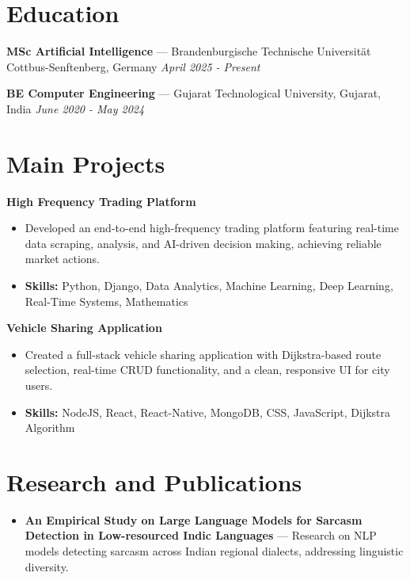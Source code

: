 \documentclass[a4paper,10pt]{article}
\begin{document}
\section*{Education}
\textbf{MSc Artificial Intelligence} — Brandenburgische Technische Universität Cottbus-Senftenberg, Germany \hfill \textit{April 2025 - Present}\par
\vspace{1.5pt}
\textbf{BE Computer Engineering} — Gujarat Technological University, Gujarat, India \hfill \textit{June 2020 - May 2024}\par

\section*{Main Projects}
\textbf{High Frequency Trading Platform}\par
\vspace{1pt}
\begin{itemize}
  \item Developed an end-to-end high-frequency trading platform featuring real-time data scraping, analysis, and AI-driven decision making, achieving reliable market actions.
  \item \textbf{Skills:} Python, Django, Data Analytics, Machine Learning, Deep Learning, Real-Time Systems, Mathematics
\end{itemize}
\vspace{3pt}
\textbf{Vehicle Sharing Application}\par
\vspace{1pt}
\begin{itemize}
  \item Created a full-stack vehicle sharing application with Dijkstra-based route selection, real-time CRUD functionality, and a clean, responsive UI for city users.
  \item \textbf{Skills:} NodeJS, React, React-Native, MongoDB, CSS, JavaScript, Dijkstra Algorithm
\end{itemize}

\section*{Research and Publications}
\begin{itemize}
\item \textbf{An Empirical Study on Large Language Models for Sarcasm Detection in Low-resourced Indic Languages} — Research on NLP models detecting sarcasm across Indian regional dialects, addressing linguistic diversity.
\end{itemize}
\end{document}
